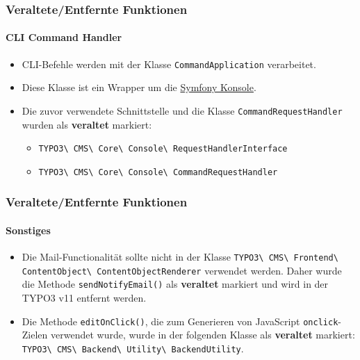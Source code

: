 \begin{frame}[fragile]
	\frametitle{Veraltete/Entfernte Funktionen}
	\framesubtitle{CLI Command Handler}

	\begin{itemize}
		\item CLI-Befehle werden mit der Klasse \texttt{CommandApplication} verarbeitet.
		\item Diese Klasse ist ein Wrapper um die
			\href{https://symfony.com/doc/current/components/console.html}{Symfony Konsole}.

		\item Die zuvor verwendete Schnittstelle und die Klasse \texttt{CommandRequestHandler} wurden als \textbf{veraltet} markiert:

			\begin{itemize}
				\item
					\texttt{TYPO3\textbackslash
						CMS\textbackslash
						Core\textbackslash
						Console\textbackslash
						RequestHandlerInterface}
				\item
					\texttt{TYPO3\textbackslash
						CMS\textbackslash
						Core\textbackslash
						Console\textbackslash
						CommandRequestHandler}
			\end{itemize}

	\end{itemize}

\end{frame}


\begin{frame}[fragile]
	\frametitle{Veraltete/Entfernte Funktionen}
	\framesubtitle{Sonstiges}

	\begin{itemize}
		\item Die Mail-Functionalität sollte nicht in der Klasse\newline
			\small
				\texttt{TYPO3\textbackslash
					CMS\textbackslash
					Frontend\textbackslash
					ContentObject\textbackslash
					ContentObjectRenderer} verwendet werden.\newline
			\normalsize
			Daher wurde die Methode \texttt{sendNotifyEmail()} als \textbf{veraltet} markiert und wird in der TYPO3 v11 entfernt werden.

		\item Die Methode \texttt{editOnClick()}, die zum Generieren von JavaScript \texttt{onclick}-Zielen
			verwendet wurde, wurde in der folgenden Klasse als \textbf{veraltet} markiert:\newline
			\small
				\texttt{TYPO3\textbackslash
					CMS\textbackslash
					Backend\textbackslash
					Utility\textbackslash
					BackendUtility}.
			\normalsize

	\end{itemize}

\end{frame}

